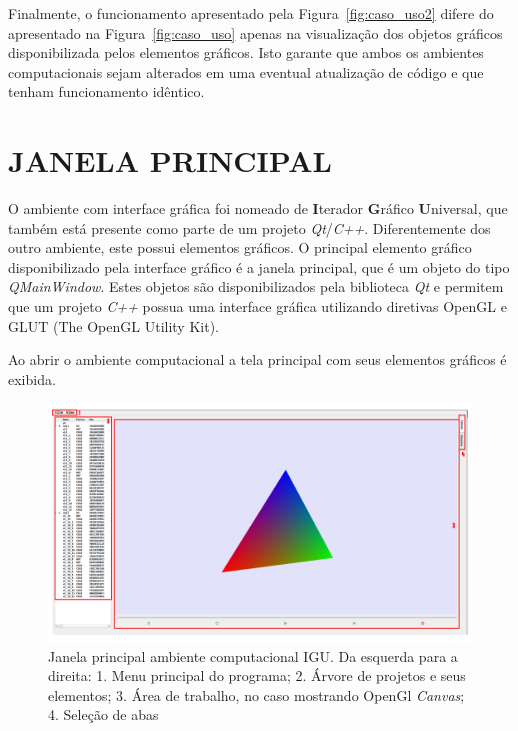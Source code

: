 Finalmente, o funcionamento apresentado pela Figura~\ref{fig:caso_uso2} difere do apresentado na Figura~\ref{fig:caso_uso} apenas na visualização dos objetos gráficos disponibilizada pelos elementos gráficos. Isto garante que ambos os ambientes computacionais sejam alterados em uma eventual atualização de código e que tenham funcionamento idêntico.

\section{JANELA PRINCIPAL}\label{sec:janela}

O ambiente com interface gráfica foi nomeado de \textbf{I}terador \textbf{G}ráfico \textbf{U}niversal, que também está presente como parte de um projeto \textit{Qt}/\textit{C++}. Diferentemente dos outro ambiente, este possui elementos gráficos. O principal elemento gráfico disponibilizado pela interface gráfico é a janela principal, que é um objeto do tipo \textit{QMainWindow}. Estes objetos são disponibilizados pela biblioteca \textit{Qt} e permitem que um projeto \textit{C++} possua uma interface gráfica utilizando diretivas OpenGL e GLUT (The OpenGL Utility Kit).

Ao abrir o ambiente computacional a tela principal com seus elementos gráficos é exibida.

\begin{figure}[!htbp]
	\centering
	\includegraphics[width=\linewidth]{Figures/IGU_001a.png}
	\caption{Janela principal ambiente computacional IGU. Da esquerda para a direita: 1. Menu principal do programa; 2. Árvore de projetos e seus elementos; 3. Área de trabalho, no caso mostrando OpenGl \textit{Canvas}; 4. Seleção de abas}
	\label{fig:UI}
\end{figure}

